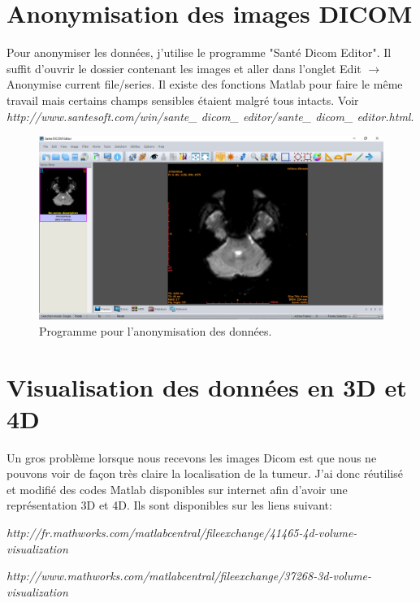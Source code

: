 \chapter*{Anonymisation des images DICOM}

Pour anonymiser les données, j'utilise le programme "Santé Dicom Editor". Il suffit d'ouvrir le dossier contenant les images et aller dans l'onglet Edit $\rightarrow$ Anonymise current file/series. Il existe des fonctions Matlab pour faire le même travail mais certains champs sensibles étaient malgré tous intacts. Voir \textit{http://www.santesoft.com/win/sante\_ dicom\_ editor/sante\_ dicom\_ editor.html}.

\begin{figure}[H]
\centering
    \includegraphics[scale=0.45,angle=90]{Images/AnonExe.png}
    \caption{Programme pour l'anonymisation des données.}
    \label{fig:AnonExe}
\end{figure}

\chapter*{Visualisation des données en 3D et 4D}

Un gros problème lorsque nous recevons les images Dicom est que nous ne pouvons voir de façon très claire la localisation de la tumeur. J'ai donc réutilisé et modifié des codes Matlab disponibles sur internet afin d'avoir une représentation 3D et 4D. Ils sont disponibles sur les liens suivant:

\medskip

\textit{http://fr.mathworks.com/matlabcentral/fileexchange/41465-4d-volume-visualization}

\textit{http://www.mathworks.com/matlabcentral/fileexchange/37268-3d-volume-visualization}

\medskip

